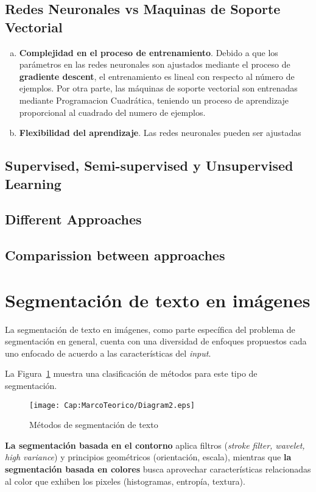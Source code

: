 {  \subsection{Redes Neuronales vs Maquinas de Soporte Vectorial}
  \begin{enumerate}[(a)]
    \item \textbf{Complejidad en el proceso de entrenamiento}. Debido a que
    los parámetros en las redes neuronales son ajustados mediante el proceso 
    de \textbf{gradiente descent}, el entrenamiento es lineal con respecto al
    número de ejemplos. Por otra parte, las máquinas de soporte vectorial son 
    entrenadas mediante Programacion Cuadrática, teniendo un proceso de 
    aprendizaje proporcional al cuadrado del numero de ejemplos.
    \item \textbf{Flexibilidad del aprendizaje}. Las redes neuronales pueden 
    ser ajustadas
  \end{enumerate}
    \subsection{Supervised, Semi-supervised y Unsupervised Learning}
    \subsection{Different Approaches}
    \subsection{Comparission between approaches}
}

\section{Segmentación de texto en imágenes}
La segmentación de texto en imágenes, como parte específica del problema de
segmentación en general, cuenta con una diversidad de enfoques propuestos cada
uno enfocado de acuerdo a las características del \textit{input}.

La Figura~\ref{cap-marcoteorico:segmentaciontexto} muestra una clasificación
de métodos para este tipo de segmentación.

\begin{figure}[h!]
	\centering
  \texttt{[image: Cap:MarcoTeorico/Diagram2.eps]}
  \caption{Métodos de segmentación de texto}
  \label{cap-marcoteorico:segmentaciontexto}
\end{figure}

\textbf{La segmentación basada en el contorno} aplica filtros (\textit{stroke
filter, wavelet, high variance}) y principios geométricos (orientación, 
escala), mientras que \textbf{la segmentación basada en colores} busca 
aprovechar características relacionadas al color que exhiben los pixeles
(histogramas, entropía, textura).

